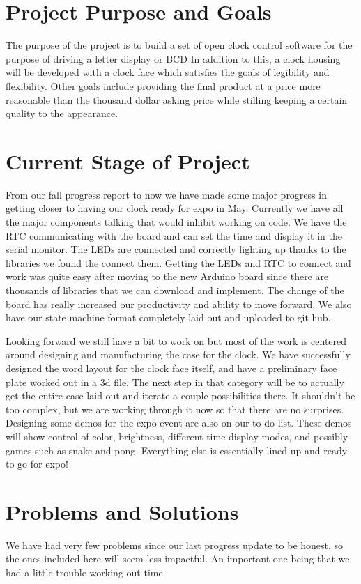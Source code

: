 \documentclass[onecolumn, draftclsnofoot,10pt, compsoc]{IEEEtran}
\begin{document}
\section{Project Purpose and Goals}
The purpose of the project is to build a set of open clock control software for the purpose of driving a letter display or BCD
In addition to this, a clock housing will be developed with a clock face which satisfies the goals of legibility and flexibility.
Other goals include providing the final product at a price more reasonable than the thousand dollar asking price while stilling keeping a certain quality to the appearance.

\section{Current Stage of Project}
From our fall progress report to now we have made some major progress in getting closer to having our clock ready for expo in May.
Currently we have all the major components talking that would inhibit working on code.
We have the RTC communicating with the board and can set the time and display it in the serial monitor.
The LEDs are connected and correctly lighting up thanks to the libraries we found the connect them.
Getting the LEDs and RTC to connect and work was quite easy after moving to the new Arduino board since there are thousands of libraries that we can download and implement.
The change of the board has really increased our productivity and ability to move forward.
We also have our state machine format completely laid out and uploaded to git hub.

Looking forward we still have a bit to work on but most of the work is centered around designing and manufacturing the case for the clock.
We have successfully designed the word layout for the clock face itself, and have a preliminary face plate worked out in a 3d file.
The next step in that category will be to actually get the entire case laid out and iterate a couple possibilities there.
It shouldn't be too complex, but we are working through it now so that there are no surprises.
Designing some demos for the expo event are also on our to do list.
These demos will show control of color, brightness, different time display modes, and possibly games such as snake and pong.
Everything else is essentially lined up and ready to go for expo!

\section{Problems and Solutions}
We have had very few problems since our last progress update to be honest, so the ones included here will seem less impactful.
An important one being that we had a little trouble working out time
\end{document}
